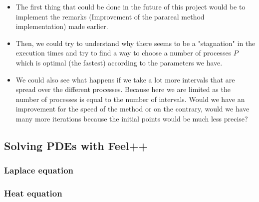 \begin{itemize}[label=-]
	\item The first thing that could be done in the future of this project would be to implement the remarks (Improvement of the parareal method implementation) made earlier.
	\item Then, we could try to understand why there seems to be a "stagnation" in the execution times and try to find a way to choose a number of processes $P$ which is optimal (the fastest) according to the parameters we have.
	\item We could also see what happens if we take a lot more intervals that are spread over the different processes. Because here we are limited as the number of processes is equal to the number of intervals. Would we have an improvement for the speed of the method or on the contrary, would we have many more iterations because the initial points would be much less precise?
\end{itemize}



\subsection{Solving PDEs with Feel++}

\subsubsection{Laplace equation}

\subsubsection{Heat equation}
\label{heat}